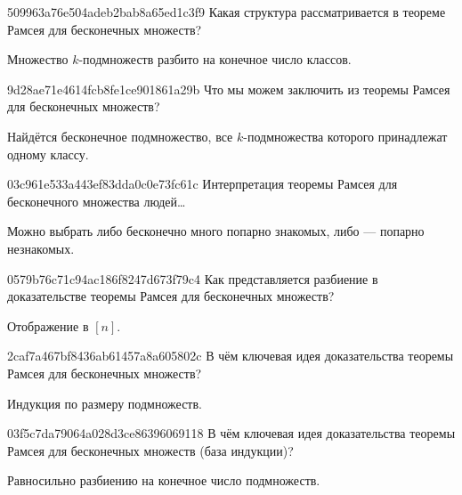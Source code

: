 \begin{note}{509963a76e504adeb2bab8a65ed1c3f9}
    Какая структура рассматривается в теореме Рамсея для бесконечных множеств?

    \begin{cloze}{1}
        Множество \({ k }\)-подмножеств разбито на конечное число классов.
    \end{cloze}
\end{note}

\begin{note}{9d28ae71e4614fcb8fe1ce901861a29b}
    Что мы можем заключить из теоремы Рамсея для бесконечных множеств?

    \begin{cloze}{1}
        Найдётся бесконечное подмножество, все \({ k }\)-под\-мно\-же\-ства которого принадлежат одному классу.
    \end{cloze}
\end{note}

\begin{note}{03c961e533a443ef83dda0c0e73fc61c}
    Интерпретация теоремы Рамсея для бесконечного множества людей\ldots

    \begin{cloze}{1}
        Можно выбрать либо бесконечно много попарно знакомых, либо --- попарно незнакомых.
    \end{cloze}
\end{note}

\begin{note}{0579b76c71c94ac186f8247d673f79c4}
    Как представляется разбиение в доказательстве теоремы Рамсея для бесконечных множеств?

    \begin{cloze}{1}
        Отображение в \({ [n] }\).
    \end{cloze}
\end{note}

\begin{note}{2caf7a467bf8436ab61457a8a605802c}
    В чём ключевая идея доказательства теоремы Рамсея для бесконечных множеств?

    \begin{cloze}{1}
        Индукция по размеру подмножеств.
    \end{cloze}
\end{note}

\begin{note}{03f5c7da79064a028d3ce86396069118}
    В чём ключевая идея доказательства теоремы Рамсея для бесконечных множеств (база индукции)?

    \begin{cloze}{1}
        Равносильно разбиению на конечное число подмножеств.
    \end{cloze}
\end{note}

